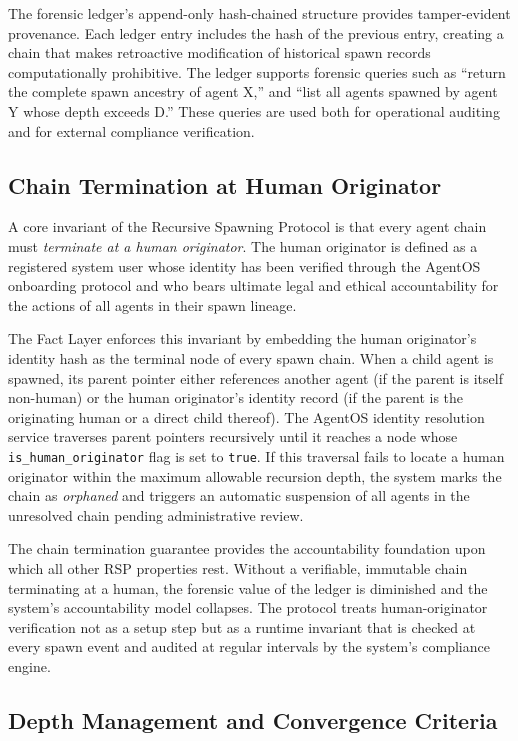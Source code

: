 The forensic ledger's append-only hash-chained structure provides tamper-evident provenance. Each ledger entry includes the hash of the previous entry, creating a chain that makes retroactive modification of historical spawn records computationally prohibitive. The ledger supports forensic queries such as ``return the complete spawn ancestry of agent X,'' and ``list all agents spawned by agent Y whose depth exceeds D.'' These queries are used both for operational auditing and for external compliance verification.

\subsection{Chain Termination at Human Originator}

A core invariant of the Recursive Spawning Protocol is that every agent chain must \emph{terminate at a human originator}. The human originator is defined as a registered system user whose identity has been verified through the AgentOS onboarding protocol and who bears ultimate legal and ethical accountability for the actions of all agents in their spawn lineage.

The Fact Layer enforces this invariant by embedding the human originator's identity hash as the terminal node of every spawn chain. When a child agent is spawned, its parent pointer either references another agent (if the parent is itself non-human) or the human originator's identity record (if the parent is the originating human or a direct child thereof). The AgentOS identity resolution service traverses parent pointers recursively until it reaches a node whose \texttt{is\_human\_originator} flag is set to \texttt{true}. If this traversal fails to locate a human originator within the maximum allowable recursion depth, the system marks the chain as \emph{orphaned} and triggers an automatic suspension of all agents in the unresolved chain pending administrative review.

The chain termination guarantee provides the accountability foundation upon which all other RSP properties rest. Without a verifiable, immutable chain terminating at a human, the forensic value of the ledger is diminished and the system's accountability model collapses. The protocol treats human-originator verification not as a setup step but as a runtime invariant that is checked at every spawn event and audited at regular intervals by the system's compliance engine.

\subsection{Depth Management and Convergence Criteria}
\label{subsection:depth-management}

